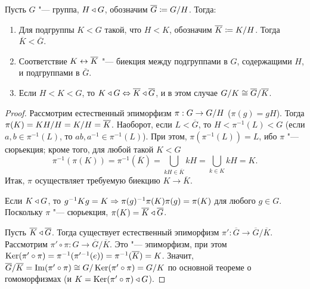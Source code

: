 \documentclass[main]{subfiles}
\begin{document}
\begin{theorem}
  Пусть $G$ "--- группа, $H \triangleleft G$,
  обозначим \( \overline{G} \coloneq \Factor{G}[H] \).
  Тогда:
  \begin{enumerate}
    \item Для подгруппы \( K < G \) такой,
      что \( H < K \), обозначим
      \( \overline{K} \coloneq \Factor{K}[H] \).
      Тогда \( \overline{K} < \overline{G} \).
    \item Соответствие $K \leftrightarrow \overline{K}$ "---
      биекция между
      подгруппами в $G$, содержащими $H$,
      и подгруппами в $\bar{G}$.
    \item Если \( H < K < G \), то
      $K \triangleleft G \Leftrightarrow \overline{K} \triangleleft \overline{G}$,
      и в этом случае
      $\Factor{G}[K] \cong \Factor{\overline{G}}[\overline{K}]$.
  \end{enumerate}
\end{theorem}
\begin{proof}
  Рассмотрим естественный эпиморфизм
  $\pi : G \to \Factor{G}[H]$ ($\pi(g) = gH$).
  Тогда $\pi(K) = K\Factor{H}[H] =
  \Factor{K}[H] = \overline{K}$.
  Наоборот, если $L < \overline{G}$,
  то $H < \pi^{-1}(L) < G$
  (если $a, b \in \pi^{-1}(L)$,
  то $ab, a^{-1} \in \pi^{-1}(L)$).
  При этом, $\pi(\pi^{-1}(L)) = L$,
  ибо $\pi$ "--- сюрьекция;
  кроме того,
  для любой такой \( K < G \)
  $$\pi^{-1}(\pi(K)) = \pi^{-1}(\overline{K}) =
  \bigcup_{kH \in \overline{K}} kH =
  \bigcup_{k \in K} kH = K.$$
  Итак, $\pi$ осуществляет требуемую биекцию
  $K \to \overline{K}$.

  Если $K \triangleleft G$, то
  $g^{-1}Kg = K \Rightarrow \pi(g)^{-1}\pi(K) \pi(g) = \pi(K)$
  для любого $g \in G$.
  Поскольку $\pi$ "--- сюрьекция,
  $\pi(K) = \overline{K} \triangleleft \overline{G}$.

  Пусть $\overline{K} \triangleleft \overline{G}$.
  Тогда существует естественный эпиморфизм
  $\pi' : \overline{G} \to \overline{G}/\overline{K}$.
  Рассмотрим $\pi' \circ \pi:
  G \to \overline{G}/\overline{K}$.
  Это "--- эпиморфизм,
  при этом $\operatorname{Ker}(\pi' \circ \pi) =
  \pi^{-1}(\pi'^{-1}(e)) = \pi^{-1}(\overline{K}) = K$.
  Значит,
  $\overline{G}/\overline{K} =
  \Img(\pi' \circ \pi) \cong G/\Ker(\pi' \circ \pi) =
  \Factor{G}[K]$
  по основной теореме о гомоморфизмах
  (и $K = \operatorname{Ker}(\pi' \circ \pi) \triangleleft G$).
\end{proof}
\end{document}
